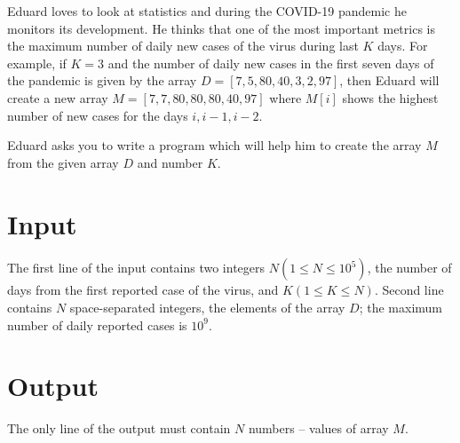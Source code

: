 Eduard loves to look at statistics and during the COVID-19 pandemic he monitors its development.
He thinks that one of the most important metrics is the maximum number of daily new cases of the virus during last $K$ days.
For example, if $K = 3$ and the number of daily new cases in the first seven days of the pandemic is given by the array
$D = [7, 5, 80, 40, 3, 2, 97]$,
then Eduard will create a new array
$M = [7, 7, 80, 80, 80, 40, 97]$ where $M[i]$ shows the highest number of new cases for the days $i, i - 1, i - 2$.

Eduard asks you to write a program which will help him to create the array $M$ from the given array $D$ and number $K$.

\section*{Input}
The first line of the input contains two integers
$N (1 \leq N \leq 10^5)$, the number of days from the first reported case of the virus, and $K (1 \leq K \leq N)$.
Second line contains $N$ space-separated integers, the elements of the array  $D$; the maximum number of daily reported cases is $10^9$.

\section*{Output}
The only line of the output must contain $N$ numbers -- values of array $M$.
